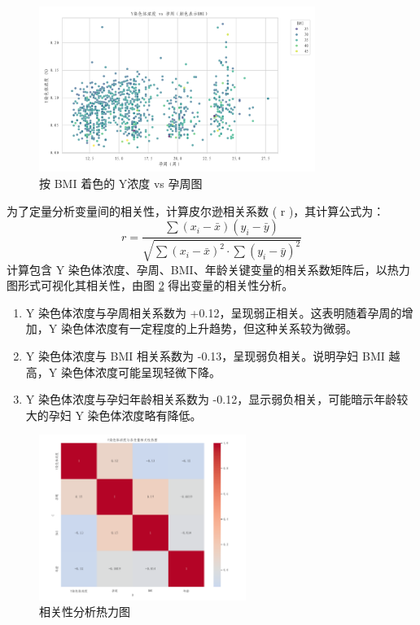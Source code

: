 \documentclass[withoutpreface,bwprint]{cumcmthesis} %
\begin{document}
\begin{figure}[H]
    \centering
    \includegraphics[width=0.8\textwidth]{../figure/C1_Output/q1_scatter_y_vs_gw_by_bmi.png}
    \caption{按 BMI 着色的 Y浓度 vs 孕周图}
    \label{fig:YandWbyBMI}
\end{figure}

为了定量分析变量间的相关性，计算皮尔逊相关系数 ( r )，其计算公式为：\begin{equation}
r = \frac{\sum (x_i - \bar{x})(y_i - \bar{y})}{\sqrt{\sum (x_i - \bar{x})^2 \cdot \sum (y_i - \bar{y})^2}}
\end{equation}计算包含 Y 染色体浓度、孕周、BMI、年龄关键变量的相关系数矩阵后，以热力图形式可视化其相关性，由图 \ref{fig:heatmap} 得出变量的相关性分析。\begin{enumerate}
    \item Y 染色体浓度与孕周相关系数为 +0.12，呈现弱正相关。这表明随着孕周的增加，Y 染色体浓度有一定程度的上升趋势，但这种关系较为微弱。
    \item Y 染色体浓度与 BMI 相关系数为 -0.13，呈现弱负相关。说明孕妇 BMI 越高，Y 染色体浓度可能呈现轻微下降。
    \item Y 染色体浓度与孕妇年龄相关系数为 -0.12，显示弱负相关，可能暗示年龄较大的孕妇 Y 染色体浓度略有降低。
\end{enumerate}



\begin{figure}[H]
    \centering
    \includegraphics[width=0.6\textwidth]{../figure/C1_Output/q1_correlation_heatmap.png}
    \caption{相关性分析热力图}
    \label{fig:heatmap}
\end{figure}
\end{document}
